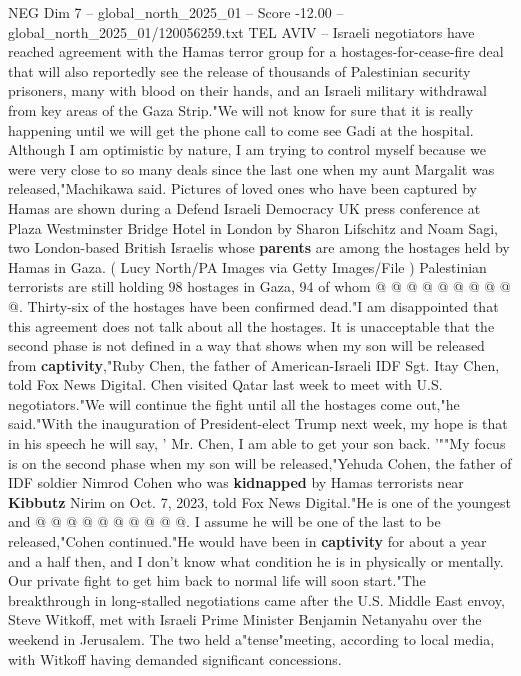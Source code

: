 \begin{textsample}{NEG Dim 7 – global\_north\_2025\_01 – Score -12.00 – global\_north\_2025\_01/120056259.txt}  \label{ex:f7_neg_052}
TEL AVIV -- Israeli negotiators have reached agreement with the Hamas terror group for a hostages-for-cease-fire deal that will also reportedly see the release of thousands of Palestinian security prisoners, many with blood on their hands, and an Israeli military withdrawal from key areas of the Gaza Strip."We will not know for sure that it is really happening until we will get the phone call to come see Gadi at the hospital.
Although I am optimistic by nature, I am trying to control myself because we were very close to so many deals since the last one when my aunt Margalit was released,"Machikawa said.
Pictures of loved ones who have been captured by Hamas are shown during a Defend Israeli Democracy UK press conference at Plaza Westminster Bridge Hotel in London by Sharon Lifschitz and Noam Sagi, two London-based British Israelis whose \textbf{parents} are among the hostages held by Hamas in Gaza. ( Lucy North/PA Images via Getty Images/File ) Palestinian terrorists are still holding 98 hostages in Gaza, 94 of whom @ @ @ @ @ @ @ @ @ @.
Thirty-six of the hostages have been confirmed dead."I am disappointed that this agreement does not talk about all the hostages.
It is unacceptable that the second phase is not defined in a way that shows when my son will be released from \textbf{captivity},"Ruby Chen, the father of American-Israeli IDF Sgt.
Itay Chen, told Fox News Digital.
Chen visited Qatar last week to meet with U.S. negotiators."We will continue the fight until all the hostages come out,"he said."With the inauguration of President-elect Trump next week, my hope is that in his speech he will say, ' Mr.
Chen, I am able to get your son back. '""My focus is on the second phase when my son will be released,"Yehuda Cohen, the father of IDF soldier Nimrod Cohen who was \textbf{kidnapped} by Hamas terrorists near \textbf{Kibbutz} Nirim on Oct. 7, 2023, told Fox News Digital."He is one of the youngest and @ @ @ @ @ @ @ @ @ @.
I assume he will be one of the last to be released,"Cohen continued."He would have been in \textbf{captivity} for about a year and a half then, and I don't know what condition he is in physically or mentally.
Our private fight to get him back to normal life will soon start."The breakthrough in long-stalled negotiations came after the U.S.
Middle East envoy, Steve Witkoff, met with Israeli Prime Minister Benjamin Netanyahu over the weekend in Jerusalem.
The two held a"tense"meeting, according to local media, with Witkoff having demanded significant concessions.

\end{textsample}
